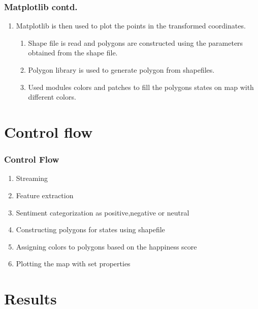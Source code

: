 \documentclass{beamer}
\begin{document}
\begin{frame}

\frametitle{Matplotlib contd.}
\begin{enumerate}
\item Matplotlib is then used to plot the points in the transformed coordinates.
\begin{enumerate}
\item Shape file is read and polygons are constructed using the parameters obtained from the shape file.
\item Polygon library is used to generate polygon from shapefiles.
\item Used modules colors and patches to fill the polygons states on map with different colors.
\end{enumerate}  
\end{enumerate} 
\end{frame}

\section{Control flow}
\begin{frame}
\frametitle{Control Flow}
\begin{enumerate}
\item Streaming
\item Feature extraction
\item Sentiment categorization as positive,negative or neutral
\item Constructing polygons for states using shapefile
\item Assigning colors to polygons based on the happiness score
\item Plotting the map with set properties
\end{enumerate}
\end{frame}


\section{Results}
\end{document}
